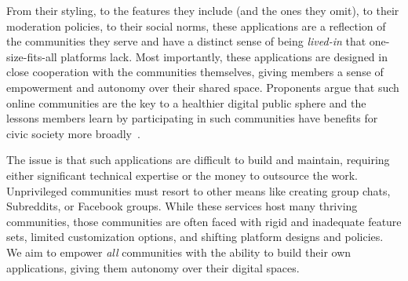 
%
From their styling, to the features they include (and the ones they omit),
to their moderation policies, to their social norms, these applications
are a reflection of the communities they serve and have a
distinct sense of being \emph{lived-in}
that one-size-fits-all platforms lack.
Most importantly, these applications are designed in close cooperation with the communities themselves,
giving members a sense of empowerment and autonomy over their shared space.
Proponents argue that such online communities are the key to a healthier
digital public sphere and the lessons members learn by participating in such
communities have benefits for civic society more broadly~\cite{threeleggedstool, runyourownsocial, archiveoftheirown}.

The issue is that such applications are difficult to build and maintain,
requiring either significant technical expertise or the money to outsource the work.
Unprivileged communities must resort to other means like creating group chats,
Subreddits, or Facebook groups. %
While these services host many thriving communities,
those communities are often faced with rigid and inadequate feature sets,
limited customization options, and shifting platform designs and policies.
We aim to empower \emph{all} communities with the ability to
build their own applications, giving them autonomy over their digital spaces.






